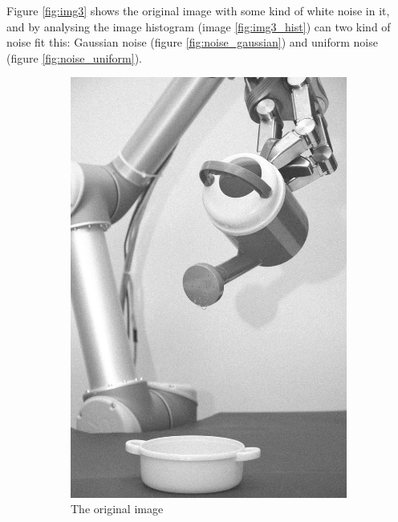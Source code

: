Figure \ref{fig:img3} shows the original image with some kind of white noise in it, and by analysing the image histogram (image \ref{fig:img3_hist}) can two kind of noise fit this: Gaussian noise (figure \ref{fig:noise_gaussian}) and uniform noise (figure \ref{fig:noise_uniform}).

\begin{figure}[H]
    \centering
    \begin{subfigure}[b]{0.25\textwidth}
        \includegraphics[width=\textwidth]{img3/src.png}
        \caption{The original image}
        \label{fig:img3_src}
    \end{subfigure}
    \begin{subfigure}[b]{0.485\textwidth}

\end{subfigure}
\end{figure}
